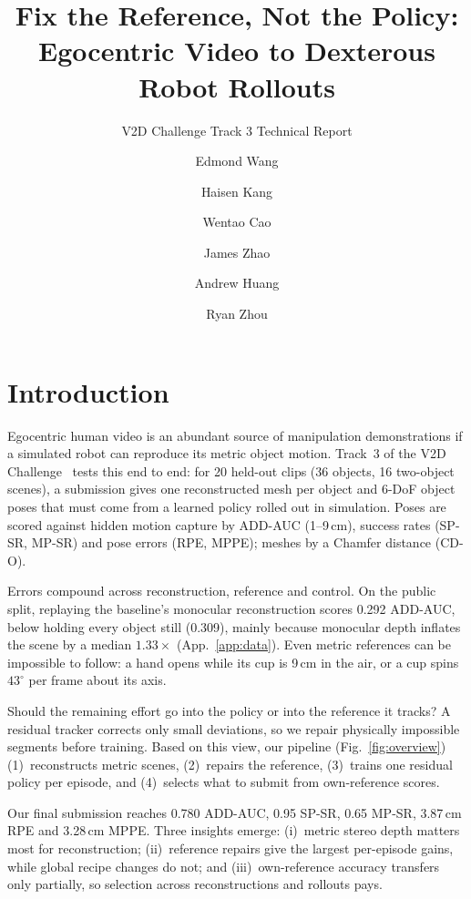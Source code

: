 \documentclass[10pt]{nvidiaextabstract}
\title{Fix the Reference, Not the Policy: Egocentric Video to Dexterous Robot Rollouts}
\subtitle{V2D Challenge Track 3 Technical Report}
\author[1*]{Edmond Wang}
\author[1*]{Haisen Kang}
\author[1*]{Wentao Cao}
\author[1*]{James Zhao}
\author[1*]{Andrew Huang}
\author[1*]{Ryan Zhou}
\author[1]{\todo{Add remaining authors or remove}}
\affil[1]{Carnegie Mellon University}
\affil[ ]{\texttt{\{edmondwa, haisenk, wentaoc, jameszh2\}@andrew.cmu.edu}}
\begin{document}
\maketitle

\section{Introduction}
\label{sec:intro}

Egocentric human video is an abundant source of manipulation demonstrations if a simulated robot can reproduce its metric object motion. Track~3 of the V2D Challenge~\cite{v2d,v2ddata} tests this end to end: for 20 held-out clips (36 objects, 16 two-object scenes), a submission gives one reconstructed mesh per object and 6-DoF object poses that must come from a learned policy rolled out in simulation. Poses are scored against hidden motion capture by ADD-AUC (1--9\,cm), success rates (SP-SR, MP-SR) and pose errors (RPE, MPPE); meshes by a Chamfer distance (CD-O).

Errors compound across reconstruction, reference and control. On the public split, replaying the baseline's monocular reconstruction scores 0.292 ADD-AUC, below holding every object still (0.309), mainly because monocular depth inflates the scene by a median $1.33\times$ (App.~\ref{app:data}). Even metric references can be impossible to follow: a hand opens while its cup is 9\,cm in the air, or a cup spins $43^\circ$ per frame about its axis.

Should the remaining effort go into the policy or into the reference it tracks? A residual tracker corrects only small deviations, so we repair physically impossible segments before training. Based on this view, our pipeline (Fig.~\ref{fig:overview}) (1)~reconstructs metric scenes, (2)~repairs the reference, (3)~trains one residual policy per episode, and (4)~selects what to submit from own-reference scores.

Our final submission reaches 0.780 ADD-AUC, 0.95 SP-SR, 0.65 MP-SR, 3.87\,cm RPE and 3.28\,cm MPPE. Three insights emerge: (i)~metric stereo depth matters most for reconstruction; (ii)~reference repairs give the largest per-episode gains, while global recipe changes do not; and (iii)~own-reference accuracy transfers only partially, so selection across reconstructions and rollouts pays.
\end{document}
